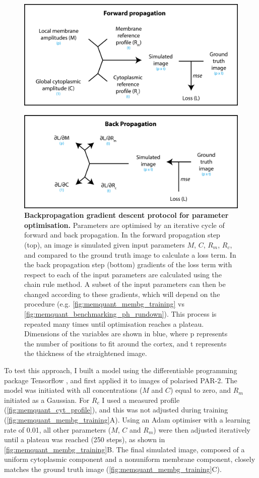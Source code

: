 \documentclass[12pt]{"report"}
\newcommand{\mycaption}[2]{\caption[#1]{\textbf{#1.} #2}}
\begin{document}
\begin{figure}
\includegraphics[scale=1.1]{memquant_forward_and_back_propagation}
\centering
\mycaption{Backpropagation gradient descent protocol for parameter optimisation}{Parameters are optimised by an iterative cycle of forward and back propagation. In the forward propagation step (top), an image is simulated given input parameters $M$, $C$, $R_m$, $R_c$, and compared to the ground truth image to calculate a loss term. In the back propagation step (bottom) gradients of the loss term with respect to each of the input parameters are calculated using the chain rule method. A subset of the input parameters can then be changed according to these gradients, which will depend on the procedure (e.g. \cref{fig:memquant_membg_training} vs \cref{fig:memquant_benchmarking_ph_rundown}). This process is repeated many times until optimisation reaches a plateau. Dimensions of the variables are shown in blue, where p represents the number of positions to fit around the cortex, and t represents the thickness of the straightened image.}
\label{fig:memquant_forward_and_back_propagation}
\end{figure}

To test this approach, I built a model using the differentiable programming package Tensorflow \citep{Abadi2016}, and first applied it to images of polarised PAR-2. The model was initiated with all concentrations ($M$ and $C$) equal to zero, and $R_m$ initiated as a Gaussian. For $R_c$ I used a measured profile (\cref{fig:memquant_cyt_profile}), and this was not adjusted during training (\cref{fig:memquant_membg_training}A). Using an Adam optimiser \citep{Kingma2015} with a learning rate of 0.01, all other parameters ($M$, $C$ and $R_m$) were then adjusted iteratively until a plateau was reached (250 steps), as shown in \cref{fig:memquant_membg_training}B. The final simulated image, composed of a uniform cytoplasmic component and a nonuniform membrane component, closely matches the ground truth image (\cref{fig:memquant_membg_training}C).\\
\end{document}
